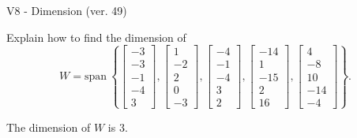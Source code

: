 \begin{exercise}
  \begin{exerciseTitle}V8 - Dimension (ver. 49)\end{exerciseTitle}
  \begin{exerciseStatement}
    Explain how to find the dimension of 
\[W=\mathrm{span}\ \left\{\left[\begin{array}{r}
-3 \\
-3 \\
-1 \\
-4 \\
3
\end{array}\right] , \left[\begin{array}{r}
1 \\
-2 \\
2 \\
0 \\
-3
\end{array}\right] , \left[\begin{array}{r}
-4 \\
-1 \\
-4 \\
3 \\
2
\end{array}\right] , \left[\begin{array}{r}
-14 \\
1 \\
-15 \\
2 \\
16
\end{array}\right] , \left[\begin{array}{r}
4 \\
-8 \\
10 \\
-14 \\
-4
\end{array}\right]\right\}.\]



  \end{exerciseStatement}
  \begin{exerciseAnswer}
   The dimension of \(W\) is  \(3\).
  


  \end{exerciseAnswer}
\end{exercise}